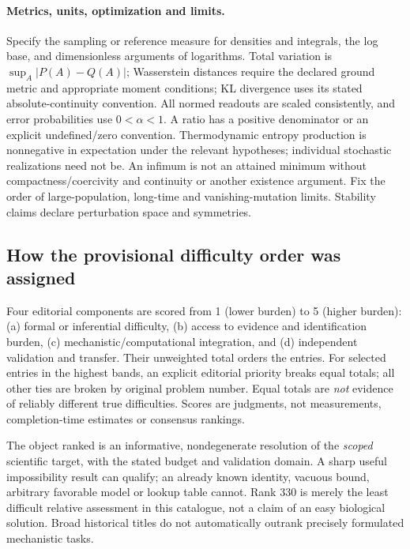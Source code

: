 \documentclass[11pt]{article}
\begin{document}
\paragraph{Metrics, units, optimization and limits.}
Specify the sampling or reference measure for densities and integrals, the log base, and dimensionless arguments of logarithms. Total variation is $\sup_A|P(A)-Q(A)|$; Wasserstein distances require the declared ground metric and appropriate moment conditions; KL divergence uses its stated absolute-continuity convention. All normed readouts are scaled consistently, and error probabilities use $0<\alpha<1$. A ratio has a positive denominator or an explicit undefined/zero convention. Thermodynamic entropy production is nonnegative in expectation under the relevant hypotheses; individual stochastic realizations need not be. An infimum is not an attained minimum without compactness/coercivity and continuity or another existence argument. Fix the order of large-population, long-time and vanishing-mutation limits. Stability claims declare perturbation space and symmetries.

\subsection*{How the provisional difficulty order was assigned}
Four editorial components are scored from 1 (lower burden) to 5 (higher burden): (a) formal or inferential difficulty, (b) access to evidence and identification burden, (c) mechanistic/computational integration, and (d) independent validation and transfer. Their unweighted total orders the entries. For selected entries in the highest bands, an explicit editorial priority breaks equal totals; all other ties are broken by original problem number. Equal totals are \emph{not} evidence of reliably different true difficulties. Scores are judgments, not measurements, completion-time estimates or consensus rankings.

The object ranked is an informative, nondegenerate resolution of the \emph{scoped} scientific target, with the stated budget and validation domain. A sharp useful impossibility result can qualify; an already known identity, vacuous bound, arbitrary favorable model or lookup table cannot. Rank 330 is merely the least difficult relative assessment in this catalogue, not a claim of an easy biological solution. Broad historical titles do not automatically outrank precisely formulated mechanistic tasks.
\end{document}
